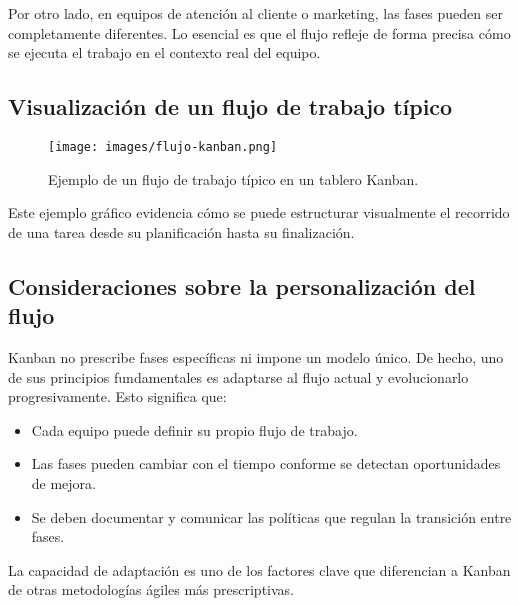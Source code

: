 Por otro lado, en equipos de atención al cliente o marketing, las fases pueden ser completamente diferentes. Lo esencial es que el flujo refleje de forma precisa cómo se ejecuta el trabajo en el contexto real del equipo.

\subsection{Visualización de un flujo de trabajo típico}

\begin{figure}[H]
\centering
\texttt{[image: images/flujo-kanban.png]}
\caption{Ejemplo de un flujo de trabajo típico en un tablero Kanban.}
\end{figure}

Este ejemplo gráfico evidencia cómo se puede estructurar visualmente el recorrido de una tarea desde su planificación hasta su finalización.

\subsection{Consideraciones sobre la personalización del flujo}

Kanban no prescribe fases específicas ni impone un modelo único. De hecho, uno de sus principios fundamentales es adaptarse al flujo actual y evolucionarlo progresivamente. Esto significa que:
\begin{itemize}
    \item Cada equipo puede definir su propio flujo de trabajo.
    \item Las fases pueden cambiar con el tiempo conforme se detectan oportunidades de mejora.
    \item Se deben documentar y comunicar las políticas que regulan la transición entre fases.
\end{itemize}

La capacidad de adaptación es uno de los factores clave que diferencian a Kanban de otras metodologías ágiles más prescriptivas.

